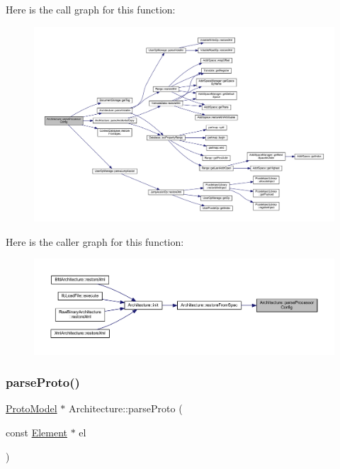 Here is the call graph for this function\+:
\nopagebreak
\begin{figure}[H]
\begin{center}
\leavevmode
\includegraphics[width=350pt]{class_architecture_a4cd4815cc79c6582840043de2e3e65eb_cgraph}
\end{center}
\end{figure}
Here is the caller graph for this function\+:
\nopagebreak
\begin{figure}[H]
\begin{center}
\leavevmode
\includegraphics[width=350pt]{class_architecture_a4cd4815cc79c6582840043de2e3e65eb_icgraph}
\end{center}
\end{figure}
\mbox{\label{class_architecture_afb2938da725012462a68a85627a2dc2c}} 
\subsubsection{\texorpdfstring{parseProto()}{parseProto()}}
{\footnotesize\ttfamily \mbox{\hyperlink{class_proto_model}{Proto\+Model}} $\ast$ Architecture\+::parse\+Proto (\begin{DoxyParamCaption}\item[{const \mbox{\hyperlink{class_element}{Element}} $\ast$}]{el }\end{DoxyParamCaption})\hspace{0.3cm}{\ttfamily [protected]}}



